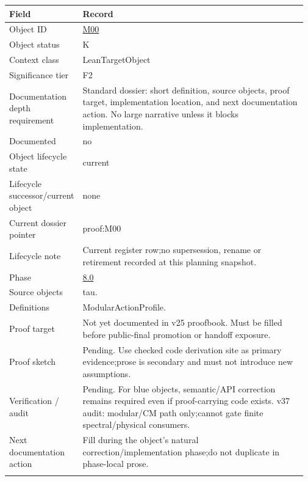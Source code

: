 \begin{longtable}{L{0.16\linewidth} L{0.81\linewidth}}
\hline
\textbf{Field} & \textbf{Record}\\
\hline
Object ID & \hyperlink{object-row-M00}{M00}\\
\hline\addlinespace[0.20em]
Object status & K\\
\hline\addlinespace[0.20em]
Context class & LeanTargetObject\\
\hline\addlinespace[0.20em]
Significance tier & F2\\
\hline\addlinespace[0.20em]
Documentation depth requirement & Standard dossier: short definition, source objects, proof target, implementation location, and next documentation action. No large narrative unless it blocks implementation.\\
\hline\addlinespace[0.20em]
Documented & no\\
\hline\addlinespace[0.20em]
Object lifecycle state & current\\
\hline\addlinespace[0.20em]
Lifecycle successor/\allowbreak{}current object & none\\
\hline\addlinespace[0.20em]
Current dossier pointer & proof:M00\\
\hline\addlinespace[0.20em]
Lifecycle note & Current register row;\newline no supersession, rename or retirement recorded at this planning snapshot.\\
\hline\addlinespace[0.20em]
Phase & \hyperlink{phase-row-8-0}{8.0}\\
\hline\addlinespace[0.20em]
Source objects & tau.\\
\hline\addlinespace[0.20em]
Definitions & ModularActionProfile.\\
\hline\addlinespace[0.20em]
Proof target & Not yet documented in v25 proofbook. Must be filled before public-final promotion or handoff exposure.\\
\hline\addlinespace[0.20em]
Proof sketch & Pending. Use checked code derivation site as primary evidence;\newline prose is secondary and must not introduce new assumptions.\\
\hline\addlinespace[0.20em]
Verification /\allowbreak{} audit & Pending. For blue objects, semantic/\allowbreak{}API correction remains required even if proof-carrying code exists. v37 audit: modular/\allowbreak{}CM path only;\newline cannot gate finite spectral/\allowbreak{}physical consumers.\\
\hline\addlinespace[0.20em]
Next documentation action & Fill during the object's natural correction/\allowbreak{}implementation phase;\newline do not duplicate in phase-local prose.\\
\hline\addlinespace[0.20em]
\end{longtable}
